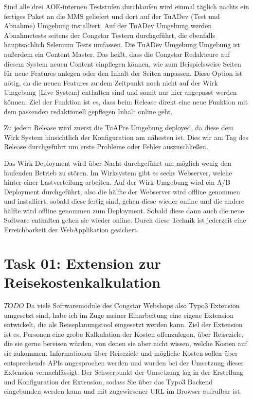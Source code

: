 \documentclass[11pt,a4paper]{article} %
\begin{document}
Sind alle drei AOE-internen Teststufen durchlaufen wird einmal täglich nachts ein fertiges Paket an die MMS geliefert und dort auf der TuADev (Test und Abnahme) Umgebung installiert. Auf der TuADev Umgebung werden Abnahmetests seitens der Congstar Testern durchgeführt, die ebenfalls hauptsächlich Selenium Tests umfassen. Die TuADev Umgebung Umgebung ist außerdem ein Content Master. Das heißt, dass die Congstar Redakteure auf diesem System neuen Content einpflegen können, wie zum Beispielsweise Seiten für neue Features anlegen oder den Inhalt der Seiten anpassen. Diese Option ist nötig, da die neuen Features zu dem Zeitpunkt noch nicht auf der Wirk Umgebung (Live System) enthalten sind und somit nur hier angepasst werden können. Ziel der Funktion ist es, dass beim Release direkt eine neue Funktion mit dem passenden redaktionell gepflegen Inhalt online geht.

Zu jedem Release wird zuerst die TuAPre Umgebung deployed, da diese dem Wirk System hinsichtlich der Konfiguration am nähesten ist.
Dies wir am Tag des Release durchgeführt um erste Probleme oder Fehler auszuschließen.

Das Wirk Deployment wird über Nacht durchgeführt um möglich wenig den laufenden Betrieb zu stören. Im Wirksystem gibt es sechs Webserver, welche hinter einer Lastverteilung arbeiten. Auf der Wirk Umgebung wird ein A/B Deployment durchgeführt, also die hälfte der Webserver wird offline genommen und installiert, sobald diese fertig sind, gehen diese wieder online und die andere hälfte wird offline genommen zum Deployment. Sobald diese dann auch die neue Software enthalten gehen sie wieder online.
Durch diese Technik ist jederzeit eine Erreichbarkeit der WebApplikation gesichert.


\section{Task 01: Extension zur Reisekostenkalkulation} \label{sec:pipeline}

$TODO$
Da viele Softwaremodule des Congstar Webshops also Typo3 Extension umgesetzt sind, habe ich im Zuge 
meiner Einarbeitung eine eigene Extension entwickelt, die als Reiseplanungstool eingesetzt werden kann.
Ziel der Extension ist es, Personen eine grobe Kalkulation der Kosten offenzulegen, über Reiseziele, 
die sie gerne bereisen würden, von denen sie aber nicht wissen, welche Kosten auf sie zukommen. 
Informationen über Reiseziele und mögliche Kosten sollen über entsprechende APIs angesprochen werden und wurden bei der Umsetzung dieser Extension vernachlässigt.
Der Schwerpunkt der Umsetzung lag in der Erstellung und Konfiguration der Extension, sodass Sie über das
Typo3 Backend eingebunden werden kann und mit zugewiesener URL im Browser aufrufbar ist.
\end{document}
